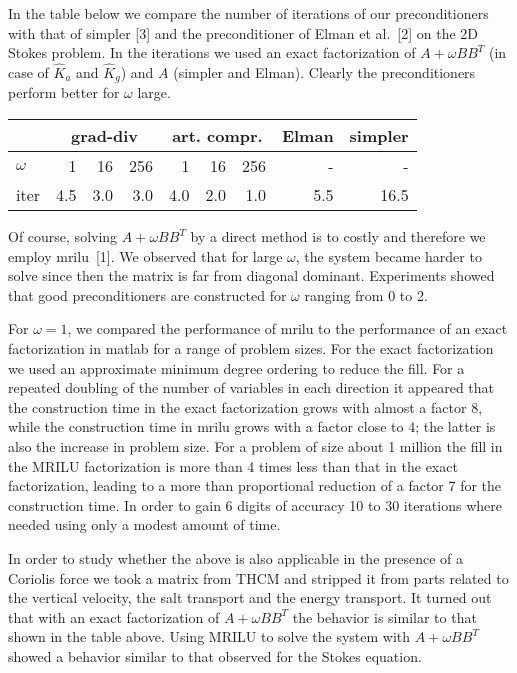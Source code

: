 \documentclass{report}
\begin{document}
In the table below we compare the number of iterations of our
preconditioners with that of {\sc simpler} [3] and the
preconditioner of Elman et al.~[2] on the 2D Stokes problem. In
the iterations we used an exact factorization of $A+\omega BB^T$
(in case of $\hat K_a$ and $\hat K_g$) and $A$ ({\sc simpler} and
Elman). Clearly the preconditioners perform better for $\omega$
large.
\begin{center}
\begin{tabular}{l|rrr|rrr|r|r|}
&\multicolumn{3}{|c|}{\sc grad-div} &\multicolumn{3}{|c|}{\sc art.
compr.} &\sc Elman & \sc simpler\\
\hline
$\omega$ & 1 & 16 & 256 & 1 & 16 & 256 & - & - \\
\sc iter& 4.5 & 3.0 & 3.0& 4.0 & 2.0 & 1.0 & 5.5& 16.5 \\
\hline
\end{tabular}
\end{center}

Of course, solving $A+\omega BB^T$ by a direct method is to
costly and therefore we employ {\sc mrilu}~[1]. We observed that
for large $\omega$, the system became harder to solve since then
the matrix is far from diagonal dominant. Experiments showed that
good preconditioners are constructed for $\omega$ ranging from 0
to 2.

For $\omega=1$, we compared the performance of {\sc mrilu} to the
performance of an exact factorization in {\sc matlab} for a range
of problem sizes. For the exact factorization we used an
approximate minimum degree ordering to reduce the fill. For a
repeated doubling of the number of variables in each direction it
appeared that the construction time in the exact factorization
grows with almost a factor $8$, while the construction time in
{\sc mrilu} grows with a factor close to $4$; the latter is also
the increase in problem size. For a problem of size about 1
million the fill in the {\sc MRILU} factorization is more than 4
times less than that in the exact factorization, leading to a more
than proportional reduction of a factor 7 for the construction
time. In order to gain 6 digits of accuracy 10 to 30 iterations
where needed using only a modest amount of time.

In order to study whether the above is also applicable in the
presence of a Coriolis force we took a matrix from THCM and
stripped it from parts related to the vertical velocity, the salt
transport and the energy transport. It turned out that with an
exact factorization of $A+\omega BB^T$ the behavior is similar to
that shown in the table above. Using {\sc MRILU} to solve the
system with $A+\omega BB^T$ showed a behavior similar to that
observed for the Stokes equation.
\end{document}

